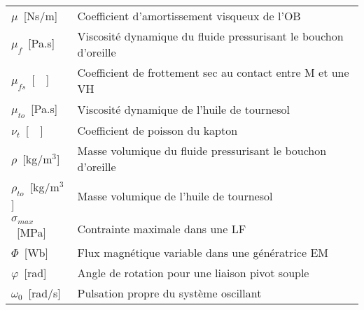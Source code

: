 \begin{table}
{\begin{tabular}{l m{12cm}}
$\mu$~[Ns/m]         & Coefficient d'amortissement visqueux de l'OB     \\
$\mu_f$~[Pa.s]       & Viscosité dynamique du fluide pressurisant le bouchon d'oreille     \\
$\mu_{fs}$~[~~]    & Coefficient de frottement sec au contact entre M et une VH         \\
$\mu_{to}$~[Pa.s]      & Viscosité dynamique de l'huile de tournesol \\   \cline{1-1}
$\nu_t$~[~~]    & Coefficient de poisson du kapton \\  \cline{1-1}
$\rho$~[kg/m$^3$]    & Masse volumique du fluide pressurisant le bouchon d'oreille     \\
$\rho_{to}$~[kg/m$^3$] & Masse volumique de l'huile de tournesol \\   \cline{1-1}
$\sigma_{max}$~[MPa] & Contrainte maximale dans une LF     \\  \cline{1-1}
$\Phi$~[Wb]          & Flux magnétique variable dans une génératrice EM  \\
$\varphi$~[rad]      & Angle de rotation pour une liaison pivot souple   \\  \cline{1-1}
$\omega_0$~[rad/s] & Pulsation propre du système oscillant \\ 
\bottomrule
\end{tabular}}
\end{table}